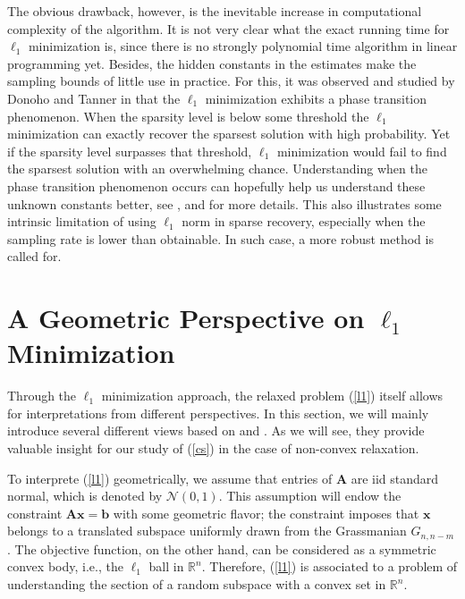 \documentclass[11pt]{article}
\numberwithin{equation}{section}
\theoremstyle{plain}
\theoremstyle{definition}
\def\R{{\mathbb R}}
\def\R{{\mathbb R}}
\def\A{{\mathbf A}}
\def\x{{\mathbf x}}
\def\b{{\mathbf b}}
\begin{document}
The obvious drawback, however, is the inevitable increase in computational complexity of the algorithm. It is not very clear what the exact running time for $\ell_1$ minimization is, since there is no strongly polynomial time algorithm in linear programming yet.   Besides, the hidden constants in the estimates make the sampling bounds of little use in practice. For this, it was observed and studied by Donoho and Tanner in \cite{donoho2005neighborliness} that the $\ell_1$ minimization exhibits a phase transition phenomenon. When the sparsity level is below some threshold the $\ell_1$ minimization can exactly recover the sparsest solution with high probability. Yet if the sparsity level surpasses that threshold, $\ell_1$ minimization would fail to find the sparsest solution with an overwhelming chance. Understanding when the phase transition phenomenon occurs can hopefully help us understand these unknown constants better, see \cite{donoho2006high}, \cite{donoho2005neighborliness} and \cite{donoho2009counting} for more details. This also illustrates some intrinsic limitation of using $\ell_1$ norm in sparse recovery, especially when the sampling rate is lower than obtainable. In such case, a more robust method is called for.    


\section{A Geometric Perspective on $\ell_1$ Minimization}

Through the $\ell_1$ minimization approach, the relaxed problem (\ref{l1}) itself allows for interpretations from different perspectives. In this section, we will mainly introduce several different views based on \cite{vershynin2015estimation} and  \cite{zhang2013theory}. As we will see, they provide valuable insight for our study of (\ref{cs}) in the case of non-convex relaxation.     

 
To interprete (\ref{l1}) geometrically, we assume that entries of $\A$ are iid standard normal, which is denoted by $\mathcal{N}(0,1)$. This assumption will endow the constraint $\A\x=\b$ with some geometric flavor; the constraint imposes that $\x$ belongs to a translated subspace uniformly drawn from the Grassmanian $G_{n,n-m}$. The objective function, on the other hand, can be considered as a symmetric convex body, i.e., the $\ell_1$ ball in $\R^n$. Therefore, (\ref{l1}) is associated to a problem of understanding the section of a random subspace with a convex set in $\R^n$. 
\end{document}
